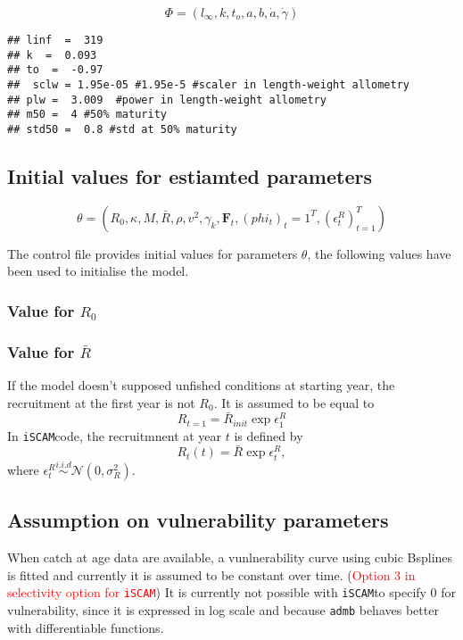 \documentclass[a4paper]{article}\usepackage{graphicx, color}
\makeatletter
\newenvironment{kframe}{%
 \def\at@end@of@kframe{}%
 \ifinner\ifhmode%
  \def\at@end@of@kframe{\end{minipage}}%
  \begin{minipage}{\columnwidth}%
 \fi\fi%
 \def\FrameCommand##1{\hskip\@totalleftmargin \hskip-\fboxsep
 \colorbox{shadecolor}{##1}\hskip-\fboxsep
     \hskip-\linewidth \hskip-\@totalleftmargin \hskip\columnwidth}%
 \MakeFramed {\advance\hsize-\width
   \@totalleftmargin\z@ \linewidth\hsize
   \@setminipage}}%
 {\par\unskip\endMakeFramed%
 \at@end@of@kframe}
\newenvironment{knitrout}{}{} %
\newcommand{\iscam}{\texttt{iSCAM}}
\newcommand{\admb}{\texttt{admb} }
\newcommand{\com}[1]{\textcolor{red}{#1}}
\makeatother
\begin{document}
$$\Phi = (l_\infty, k, t_o,a,b,\dot{a},\dot{\gamma})$$
\begin{knitrout}
\color{fgcolor}\begin{kframe}
\begin{verbatim}
## linf  =  319
## k  =  0.093
## to  =  -0.97
##  sclw = 1.95e-05 #1.95e-5 #scaler in length-weight allometry
## plw =  3.009  #power in length-weight allometry
## m50 =  4 #50% maturity
## std50 =  0.8 #std at 50% maturity
\end{verbatim}
\end{kframe}
\end{knitrout}




\subsection{Initial values for estiamted parameters}
$$\theta   =  (R_0,   \kappa,   M,  \bar{R},   \rho,  v^2,   \gamma_k,
\boldsymbol{F}_{t}, (phi_t)_t=1^T, (\epsilon_t^R)_{t=1}^T)$$



        
        The  control  file  provides  initial  values  for  parameters
        $\theta$, the  following values  have been used  to initialise
        the model.

\subsubsection*{Value for $R_0$}


\subsubsection*{Value for $\bar{R}$}
If the  model doesn't supposed  unfished conditions at  starting year,
the recruitment at  the first year is  not $R_0$. It is  assumed to be
equal to
$$R_{t=1} = \bar{R}_{init} \exp{\epsilon_1^R}$$
In \iscam code, the recruitmnent at year $t$ is defined by
$$R_t(t)=\bar{R} \exp{\epsilon_t^R}, $$
  where $\epsilon_t^R\overset{i.i.d}{\sim} \mathcal{N}(0,\sigma_R^2)$.


\subsection{Assumption on vulnerability parameters}
When catch at age data are available, a vunlnerability curve using cubic Bsplines is fitted and currently it is assumed to be constant over time. (\com{Option 3 in selectivity option for \iscam})
It is currently not possible with \iscam to specify 0 for vulnerability, since it is expressed in log scale and because \admb behaves better with differentiable functions.
\end{document}
